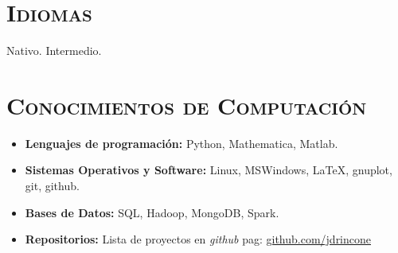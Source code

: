 \documentclass[11pt,a4paper,sansserif]{moderncv}   %
\begin{document}
\section{\textsc{Idiomas}}
	{Nativo.}
	{Intermedio.}




\section{\textsc{Conocimientos de Computación}}

\cvitem{}
	{\begin{itemize}
	\item \textbf{Lenguajes de programaci\'on:} Python, Mathematica, Matlab.
	\item \textbf{Sistemas Operativos y Software:} Linux, MSWindows, LaTeX, gnuplot, git, github.
	\item \textbf{Bases de Datos:} SQL, Hadoop, MongoDB, Spark.
	\item \textbf{Repositorios:} Lista de proyectos en \textit{github} pag: 
	\url{github.com/jdrincone}
	\end{itemize}}



\end{document}
